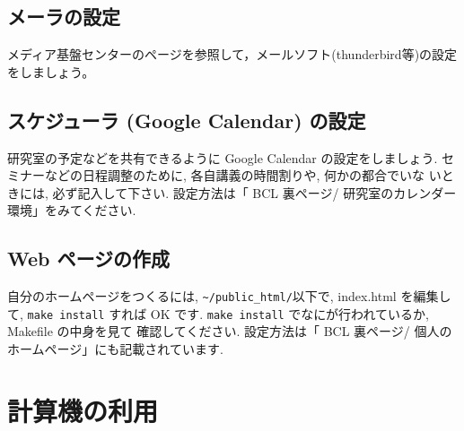 \documentclass{jarticle}
\begin{document}
\subsection{メーラの設定}
メディア基盤センターのページを参照して，メールソフト(thunderbird等)の設定をしましょう。

\subsection{スケジューラ (Google Calendar) の設定}

研究室の予定などを共有できるように Google Calendar の設定をしましょう.
セミナーなどの日程調整のために, 各自講義の時間割りや, 何かの都合でいな
いときには, 必ず記入して下さい.
設定方法は「 BCL 裏ページ/ 研究室のカレンダー環境」をみてください.



\subsection{Web ページの作成}

自分のホームページをつくるには, \verb|~/public_html/|以下で,
index.html を編集して, \verb|make install| すれば OK です.
\verb|make install| でなにが行われているか, Makefile の中身を見て
確認してください.
設定方法は「 BCL 裏ページ/ 個人のホームページ」にも記載されています.


\section{計算機の利用}
\end{document}
